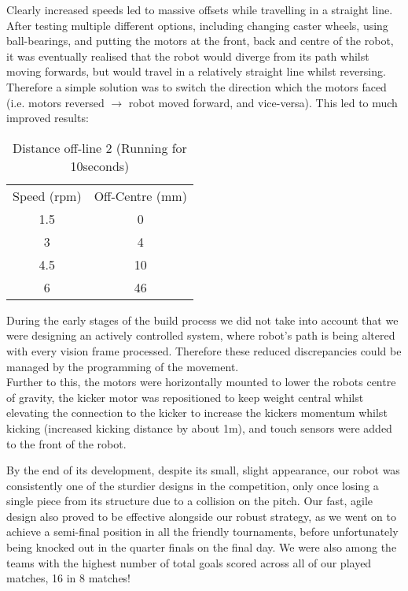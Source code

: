 Clearly increased speeds led to massive offsets while travelling in a straight line. After testing multiple different options, including changing caster wheels, using ball-bearings, and putting the motors at the front, back and centre of the robot, it was eventually realised that the robot would diverge from its path whilst moving forwards, but would travel in a relatively straight line whilst reversing. Therefore a simple solution was to switch the direction which the motors faced (i.e. motors reversed $\rightarrow$ robot moved forward, and vice-versa). This led to much improved results:
\begin{table}[ht]
\caption{Distance off-line 2 (Running for 10seconds)}
\centering
\begin{tabular}{c c}
\hline\hline
Speed (rpm) & Off-Centre (mm) \\
1.5 & 0 \\
3 & 4 \\
4.5 & 10\\
6 & 46\\
\hline\hline
\end{tabular}
\label{table:online}
\end{table}

During the early stages of the build process we did not take into account that we were designing an actively controlled system, where robot’s path is being altered with every vision frame processed. Therefore these reduced discrepancies could be managed by the programming of the movement.\\

Further to this, the motors were horizontally mounted to lower the robots centre of gravity, the kicker motor was repositioned to keep weight central whilst elevating the connection to the kicker to increase the kickers momentum whilst kicking (increased kicking distance by about 1m), and touch sensors were added to the front of the robot. \linebreak

By the end of its development, despite its small, slight appearance, our robot was consistently one of the sturdier designs in the competition, only once losing a single piece from its structure due to a collision on the pitch.  Our fast, agile design also proved to be effective alongside our robust strategy, as we went on to achieve a semi-final position in all the friendly tournaments, before unfortunately being knocked out in the quarter finals on the final day. We were also among the teams with the highest number of total goals scored across all of our played matches, 16 in 8 matches!